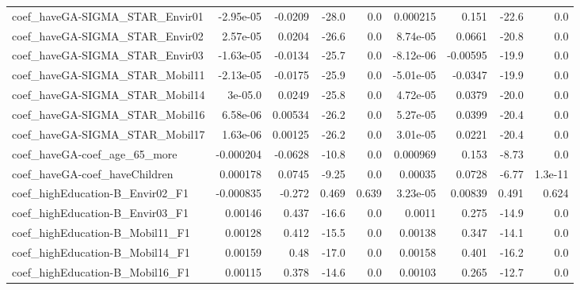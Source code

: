 \begin{tabular}{lrrrrrrrr}
coef\_haveGA-SIGMA\_STAR\_Envir01            &   -2.95e-05 &      -0.0209 &   -28.0 &      0.0 &   0.000215 &       0.151 &        -22.6 &           0.0 \\
coef\_haveGA-SIGMA\_STAR\_Envir02            &    2.57e-05 &       0.0204 &   -26.6 &      0.0 &   8.74e-05 &      0.0661 &        -20.8 &           0.0 \\
coef\_haveGA-SIGMA\_STAR\_Envir03            &   -1.63e-05 &      -0.0134 &   -25.7 &      0.0 &  -8.12e-06 &    -0.00595 &        -19.9 &           0.0 \\
coef\_haveGA-SIGMA\_STAR\_Mobil11            &   -2.13e-05 &      -0.0175 &   -25.9 &      0.0 &  -5.01e-05 &     -0.0347 &        -19.9 &           0.0 \\
coef\_haveGA-SIGMA\_STAR\_Mobil14            &     3e-05.0 &       0.0249 &   -25.8 &      0.0 &   4.72e-05 &      0.0379 &        -20.0 &           0.0 \\
coef\_haveGA-SIGMA\_STAR\_Mobil16            &    6.58e-06 &      0.00534 &   -26.2 &      0.0 &   5.27e-05 &      0.0399 &        -20.4 &           0.0 \\
coef\_haveGA-SIGMA\_STAR\_Mobil17            &    1.63e-06 &      0.00125 &   -26.2 &      0.0 &   3.01e-05 &      0.0221 &        -20.4 &           0.0 \\
coef\_haveGA-coef\_age\_65\_more              &   -0.000204 &      -0.0628 &   -10.8 &      0.0 &   0.000969 &       0.153 &        -8.73 &           0.0 \\
coef\_haveGA-coef\_haveChildren             &    0.000178 &       0.0745 &   -9.25 &      0.0 &    0.00035 &      0.0728 &        -6.77 &       1.3e-11 \\
coef\_highEducation-B\_Envir02\_F1           &   -0.000835 &       -0.272 &   0.469 &    0.639 &   3.23e-05 &     0.00839 &        0.491 &         0.624 \\
coef\_highEducation-B\_Envir03\_F1           &     0.00146 &        0.437 &   -16.6 &      0.0 &     0.0011 &       0.275 &        -14.9 &           0.0 \\
coef\_highEducation-B\_Mobil11\_F1           &     0.00128 &        0.412 &   -15.5 &      0.0 &    0.00138 &       0.347 &        -14.1 &           0.0 \\
coef\_highEducation-B\_Mobil14\_F1           &     0.00159 &         0.48 &   -17.0 &      0.0 &    0.00158 &       0.401 &        -16.2 &           0.0 \\
coef\_highEducation-B\_Mobil16\_F1           &     0.00115 &        0.378 &   -14.6 &      0.0 &    0.00103 &       0.265 &        -12.7 &           0.0 \\

\end{tabular}
